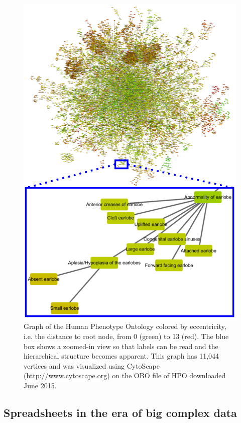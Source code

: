 \begin{figure}
\centering
\includegraphics[scale=1.0]{img/discussion_hpograph}
\caption[Graph of the Human Phenotype Ontology]{Graph of the Human Phenotype Ontology colored by eccentricity, i.e. the distance to root node, from 0 (green) to 13 (red). The blue box shows a zoomed-in view so that labels can be read and the hierarchical structure becomes apparent. This graph has 11,044 vertices and was visualized using CytoScape (\url{http://www.cytoscape.org}) on the OBO file of HPO downloaded June 2015.}
\label{fig:discussion_hpograph}
\end{figure}

\subsection{Spreadsheets in the era of big complex data} \label{modelsection_spreadsheet}

